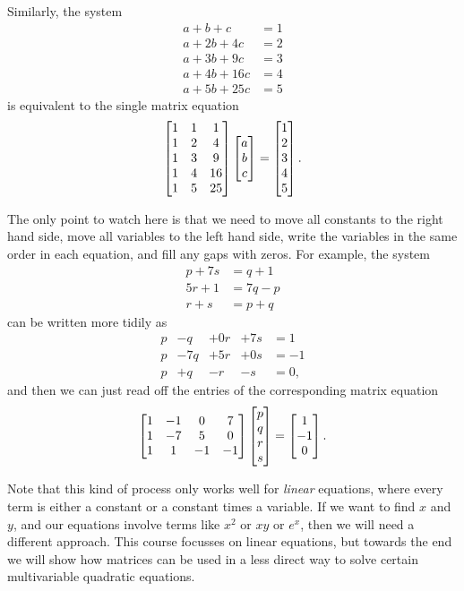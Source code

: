 \documentclass[reqno]{amsart}
\theoremstyle{definition}
\begin{document}
Similarly, the system
\begin{align*}
 a +  b +  c  &= 1 \\
 a + 2b + 4c  &= 2 \\
 a + 3b + 9c  &= 3 \\
 a + 4b + 16c &= 4 \\
 a + 5b + 25c &= 5
\end{align*}
is equivalent to the single matrix equation
\[ \left[\begin{matrix} 1 & 1 &  1 \\
        1 & 2 &  4 \\
        1 & 3 &  9 \\
        1 & 4 & 16 \\
        1 & 5 & 25 \end{matrix}\right]
   \left[\begin{matrix} a \\ b \\ c \end{matrix}\right] =
   \left[\begin{matrix} 1 \\ 2 \\ 3 \\ 4 \\ 5 \end{matrix}\right].
\]

The only point to watch here is that we need to move all constants to
the right hand side, move all variables to the left hand side, write
the variables in the same order in each equation, and fill any gaps
with zeros.  For example, the system
\begin{align*}
 p+7s &= q+1 \\
 5r+1 &= 7q-p \\
 r+s &= p+q
\end{align*}
can be written more tidily as
\[ \begin{array}{rrrrl}
 p & -q  & +0r & +7s &= 1 \\
 p & -7q & +5r & +0s &= -1 \\
 p & +q  & -r  & -s  &= 0,
\end{array} \]
and then we can just read off the entries of the corresponding matrix
equation
\[ \left[\begin{matrix} 1 & -1 & 0 & 7 \\ 1 & -7 & 5 & 0 \\ 1 & 1 & -1 & -1 \end{matrix}\right]
    \left[\begin{matrix} p \\ q \\ r \\ s \end{matrix}\right] = \left[\begin{matrix} 1 \\ -1 \\ 0 \end{matrix}\right].
\]

Note that this kind of process only works well for \emph{linear}
equations, where every term is either a constant or a constant times a
variable.  If we want to find $x$ and $y$, and our equations involve
terms like $x^2$ or $xy$ or $e^x$, then we will need a different
approach.  This course focusses on linear equations, but towards the
end we will show how matrices can be used in a less direct way to
solve certain multivariable quadratic equations.
\end{document}
